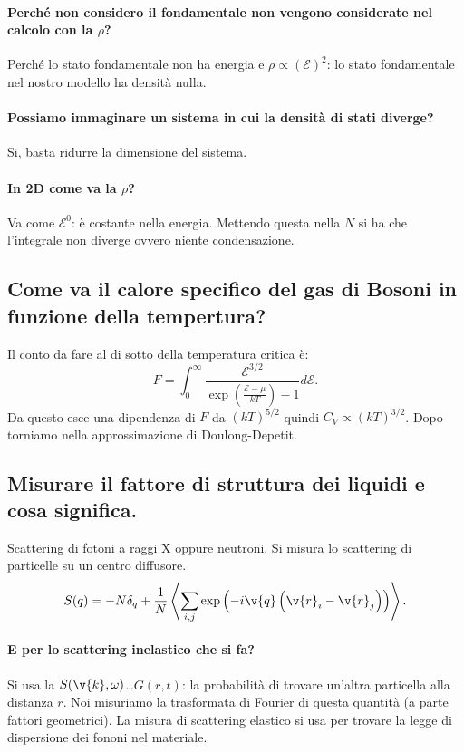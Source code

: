 \paragraph{Perché non considero il fondamentale non vengono considerate nel calcolo con la $\rho$?}%
Perché lo stato fondamentale non ha energia e $\rho  \propto\left(\mathcal{E}\right)^2$: lo stato fondamentale nel nostro modello ha densità nulla.
\paragraph{Possiamo immaginare un sistema in cui la densità di stati diverge?}%
\label{par:Possiamo immaginare un sistema in cui la densità di stati diverge?}
Si, basta ridurre la dimensione del sistema.
\paragraph{In 2D come va la $\rho$?}%
Va come $\mathcal{E}^0$: è costante nella energia. Mettendo questa nella $N$ si ha che l'integrale non diverge ovvero niente condensazione.
\subsection{Come va il calore specifico del gas di Bosoni in funzione della tempertura?}%
Il conto da fare al di sotto della temperatura critica è:
\[
 F = \int_{0}^{\infty} \frac{\mathcal{E}^{3 /2}}{\exp\left(\frac{\mathcal{E}-\mu}{kT}\right)-1}d\mathcal{E} 
.\] 
Da questo esce una dipendenza di $F$ da $\left(kT\right)^{5 /2}$ quindi $C_V \propto \left(kT\right)^{3 /2}$.
Dopo torniamo nella approssimazione di Doulong-Depetit.
\subsection{Misurare il fattore di struttura dei liquidi e cosa significa.}%
\label{sub:Misurare il fattore di struttura dei liquidi e cosa significa.}
Scattering di fotoni a raggi X oppure neutroni. Si misura lo scattering di particelle su un centro diffusore.
\[
    S(q) = -N\delta_q + \frac{1}{N}\left< \sum_{i,j}^{} \exp\left(-i\v{q}\left(\v{r}_i-\v{r}_j\right)\right)\right>
.\] 
\paragraph{E per lo scattering inelastico che si fa?}%
\label{par:E per lo scattering inelastico che si fa?}
Si usa la $S(\v{k},\omega)$\ldots $G(r,t)$: la probabilità di trovare un'altra particella alla distanza $r$. Noi misuriamo la trasformata di Fourier di questa quantità (a parte fattori geometrici).
La misura di scattering elastico si usa per trovare la legge di dispersione dei fononi nel materiale. 
